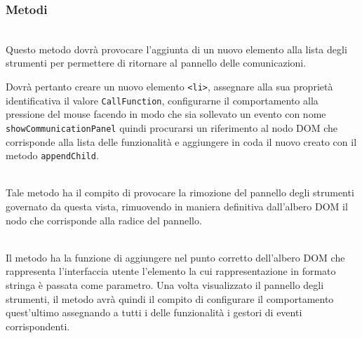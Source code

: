 \subsubsection*{Metodi}
\begin{description}

  \item{}\\
  Questo metodo dovrà provocare l'aggiunta di un nuovo elemento alla lista degli strumenti per permettere di ritornare al pannello delle comunicazioni.
  
  Dovrà pertanto creare un nuovo elemento \verb'<li>', assegnare alla sua proprietà identificativa il valore \verb'CallFunction', configurarne il comportamento alla pressione del mouse facendo in modo che sia sollevato un evento con nome \verb'showCommunicationPanel' quindi procurarsi un riferimento al nodo DOM che corrisponde alla lista delle funzionalità e aggiungere in coda il nuovo  creato con il metodo \verb'appendChild'.
  
  \item{}\\
  Tale metodo ha il compito di provocare la rimozione del pannello degli strumenti governato da questa vista, rimuovendo in maniera definitiva dall'albero DOM il nodo che corrisponde alla radice del pannello.
  
  \item{}\\
  Il metodo ha la funzione di aggiungere nel punto corretto dell'albero DOM che rappresenta l'interfaccia utente l'elemento la cui rappresentazione in formato stringa è passata come parametro. Una volta visualizzato il pannello degli strumenti, il metodo avrà quindi il compito di configurare il comportamento quest'ultimo assegnando a tutti i  delle funzionalità i gestori di eventi corrispondenti.
  

\end{description}
